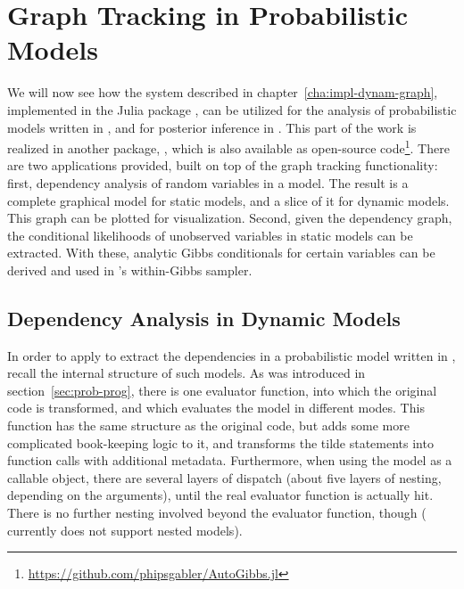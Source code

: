 \chapter{Graph Tracking in Probabilistic Models}
\label{cha:graph-track-prob}

We will now see how the system described in chapter~\ref{cha:impl-dynam-graph}, implemented in the
Julia package \irtrackerjl{}, can be utilized for the analysis of probabilistic models written in
\dppljl{}, and for posterior inference in \turingjl{}.  This part of the work is realized in another
package, \autogibbsjl{}, which is also available as open-source
code\footnote{\url{https://github.com/phipsgabler/AutoGibbs.jl}}.  There are two applications
provided, built on top of the graph tracking functionality: first, dependency analysis of random
variables in a model.  The result is a complete graphical model for static models, and a slice of it
for dynamic models.  This graph can be plotted for visualization.  Second, given the dependency
graph, the conditional likelihoods of unobserved variables in static models can be extracted.  With
these, analytic Gibbs conditionals for certain variables can be derived and used in \turingjl{}'s
within-Gibbs sampler.

\section{Dependency Analysis in Dynamic Models}
\label{sec:dependency-analysis}

In order to apply \irtrackerjl{} to extract the dependencies in a probabilistic model written in
\dppljl{}, recall the internal structure of such models.  As was introduced in
section~\ref{sec:prob-prog}, there is one evaluator function, into which the original code is
transformed, and which evaluates the model in different modes.  This function has the same structure
as the original code, but adds some more complicated book-keeping logic to it, and transforms the
tilde statements into function calls with additional metadata.  Furthermore, when using the model as
a callable object, there are several layers of dispatch (about five layers of nesting, depending on
the arguments), until the real evaluator function is actually hit.  There is no further nesting
involved beyond the evaluator function, though (\turingjl{} currently does not support nested
models).

